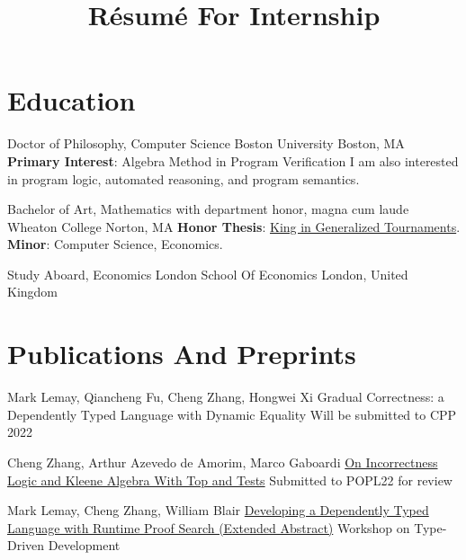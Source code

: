 \documentclass[11pt,roman]{moderncv}        %
\title{Résumé For Internship}
\begin{document}

\makecvtitle{}

\setlength{\parskip}{2.5px}
\linespread{1.3}
\selectfont


\section{Education}

{Doctor of Philosophy, Computer Science} {}
{Boston University}
{Boston, MA}
{\textbf{Primary Interest}: Algebra Method in Program Verification\newline 
I am also interested in program logic, automated reasoning, and program semantics.}  %

{Bachelor of Art, Mathematics} {with department honor, magna cum laude}
{Wheaton College}
{Norton, MA}
{\textbf{Honor Thesis}: \href{http://hdl.handle.net/11040/24570}{King in Generalized Tournaments}.\\
\textbf{Minor}: Computer Science, Economics.
}

{Study Aboard, Economics} {}
{London School Of Economics}
{London, United Kingdom}
{}  %



\section{Publications And Preprints}

{Mark Lemay, Qiancheng Fu, Cheng Zhang, Hongwei Xi}
{Gradual Correctness: a Dependently Typed Language with Dynamic Equality}
{Will be submitted to CPP 2022}{}{}

{Cheng Zhang, Arthur Azevedo de Amorim, Marco Gaboardi}
{\href{https://arxiv.org/abs/2108.07707}{On Incorrectness Logic and Kleene Algebra With Top and Tests}}
{Submitted to POPL22 for review}
{}{}

{Mark Lemay, Cheng Zhang, William Blair}
{\href{https://icfp20.sigplan.org/details/tyde-2020-papers/7/Developing-a-Dependently-Typed-Language-with-Runtime-Proof-Search-Extended-Abstract-}
{Developing a Dependently Typed Language with Runtime Proof Search (Extended Abstract)}}
{Workshop on Type-Driven Development}
{}{}
\end{document}
